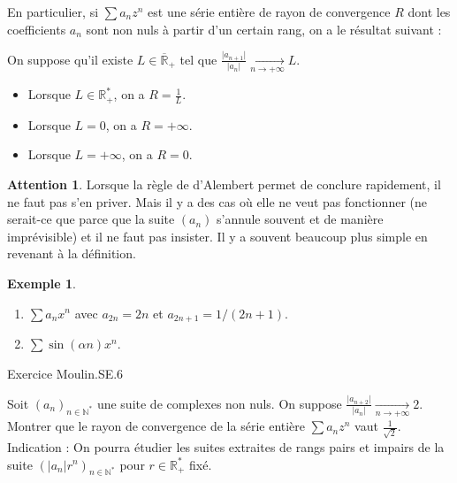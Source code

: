 \documentclass[french]{article}
\newcommand{\N}{\mathbb{N}}
\newcommand{\R}{\mathbb{R}}
\newcommand{\st}{^*}
\theoremstyle{plain}
\theoremstyle{definition}
\newtheorem*{ex}{Exemple}
\newtheorem*{attention}{Attention}
\theoremstyle{remark}
\begin{document}
En particulier, si $\displaystyle\sum a_nz^n$ est une série entière de rayon de convergence $R$ dont les coefficients $a_n$ sont non nuls à partir d'un certain rang, on a le résultat suivant :

\begin{prop}%
	On suppose qu'il existe $L\in\overline{\R}_+$ tel que $\displaystyle\frac{\lvert a_{n+1}\rvert}{\lvert a_n\rvert}\xrightarrow[n\to+\infty]{}L$.
	\begin{itemize}
		\item Lorsque $L\in\R_+\st$, on a $R=\displaystyle\frac{1}{L}$.
		\item Lorsque $L=0$, on a $R=+\infty$.
		\item Lorsque $L=+\infty$, on a $R=0$.
	\end{itemize}
\end{prop}

\begin{attention}
	Lorsque la règle de d'Alembert permet de conclure rapidement, il ne faut pas s'en priver. Mais il y a des cas où elle ne veut pas fonctionner (ne serait-ce que parce que la suite $(a_n)$ s'annule souvent et de manière imprévisible) et il ne faut pas insister. Il y a souvent beaucoup plus simple en revenant à la définition.
\end{attention}

\begin{ex}
	\begin{enumerate}
		\item $\displaystyle\sum a_nx^n$ avec $a_{2n}=2n$ et $a_{2n+1}=1/(2n+1)$.
		\item $\displaystyle\sum\sin(\alpha n)x^n$.
	\end{enumerate}
\end{ex}

Exercice Moulin.SE.6

\begin{exo}
	Soit $(a_n)_{n\in\N\st}$ une suite de complexes non nuls. On suppose $\displaystyle\frac{\lvert a_{n+2}\rvert}{\lvert a_n\rvert}\xrightarrow[n\to+\infty]{}2$. \\
	Montrer que le rayon de convergence de la série entière $\displaystyle\sum a_nz^n$ vaut $\displaystyle\frac{1}{\sqrt{2}}$. \\
	Indication : On pourra étudier les suites extraites de rangs pairs et impairs de la suite $(\lvert a_n\rvert r^n)_{n\in\N\st}$ pour $r\in\R_+\st$ fixé.
\end{exo}
\end{document}
